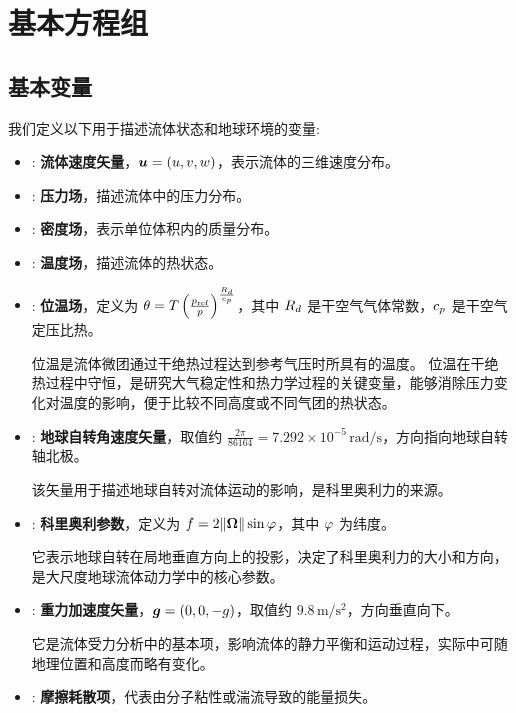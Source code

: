 \section{基本方程组}

\subsection{基本变量}

我们定义以下用于描述流体状态和地球环境的变量:
\begin{itemize}
    \item[$\vel$]: \textbf{流体速度矢量}，$\bm{u} = (u, v, w)$，表示流体的三维速度分布。

    \item[$\pressure$]: \textbf{压力场}，描述流体中的压力分布。

    \item[$\density$]: \textbf{密度场}，表示单位体积内的质量分布。

    \item[$\temperature$]: \textbf{温度场}，描述流体的热状态。

    \item[$\ptemp$]: \textbf{位温场}，定义为 $\theta = T \left(\frac{p_\text{ref}}{p}\right)^{\frac{R_d}{c_p}}$，其中 $R_d$ 是干空气气体常数，$c_p$ 是干空气定压比热。

    位温是流体微团通过干绝热过程达到参考气压时所具有的温度。
    位温在干绝热过程中守恒，是研究大气稳定性和热力学过程的关键变量，能够消除压力变化对温度的影响，便于比较不同高度或不同气团的热状态。

    \item[$\rotationvec$]: \textbf{地球自转角速度矢量}，取值约 $\frac{2\pi}{86164} = 7.292 \times 10^{-5}\,\mathrm{rad/s}$，方向指向地球自转轴北极。

    该矢量用于描述地球自转对流体运动的影响，是科里奥利力的来源。

    \item[$\coriolis$]: \textbf{科里奥利参数}，定义为 $f = 2\lVert \bm{\Omega} \rVert \sin\varphi$，其中 $\varphi$ 为纬度。

    它表示地球自转在局地垂直方向上的投影，决定了科里奥利力的大小和方向，是大尺度地球流体动力学中的核心参数。

    \item[$\gravity$]: \textbf{重力加速度矢量}，$\bm{g} = (0, 0, -g)$，取值约 $9.8\,\mathrm{m/s^2}$，方向垂直向下。

    它是流体受力分析中的基本项，影响流体的静力平衡和运动过程，实际中可随地理位置和高度而略有变化。

    \item[$\dissipation$]: \textbf{摩擦耗散项}，代表由分子粘性或湍流导致的能量损失。
\end{itemize}

